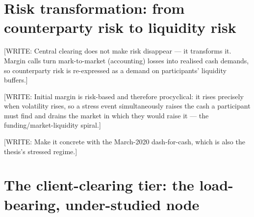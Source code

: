 \section{Risk transformation: from counterparty risk to liquidity risk}
\label{sec:intro-risktransformation}

[WRITE: Central clearing does not make risk disappear — it transforms it. Margin
calls turn mark-to-market (accounting) losses into realised cash demands, so
counterparty risk is re-expressed as a demand on participants' liquidity buffers.]
\citep{cont_2017}

[WRITE: Initial margin is risk-based and therefore procyclical: it rises precisely
when volatility rises, so a stress event simultaneously raises the cash a
participant must find and drains the market in which they would raise it — the
funding/market-liquidity spiral.] \citep{brunnermeier_pedersen_2009,murphy_2014}

[WRITE: Make it concrete with the March-2020 dash-for-cash, which is also the
thesis's stressed regime.] \citep{esrb_2020}

\section{The client-clearing tier: the load-bearing, under-studied node}
\label{sec:intro-tier}

